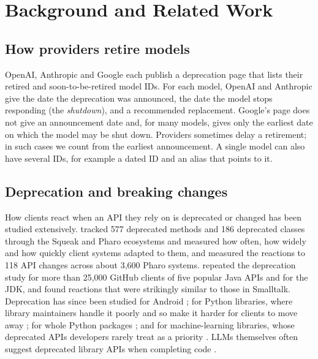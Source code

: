 \section{Background and Related Work}\label{sec:background}

\subsection{How providers retire models}

OpenAI, Anthropic and Google each publish a deprecation page that lists their retired and soon-to-be-retired model IDs. For each model, OpenAI and Anthropic give the date the deprecation was announced, the date the model stops responding (the \emph{shutdown}), and a recommended replacement. Google's page does not give an announcement date and, for many models, gives only the earliest date on which the model may be shut down. Providers sometimes delay a retirement; in such cases we count from the earliest announcement. A single model can also have several IDs, for example a dated ID and an alias that points to it.

\subsection{Deprecation and breaking changes}

How clients react when an API they rely on is deprecated or changed has been studied extensively. \citet{robbes2012deprecation} tracked 577 deprecated methods and 186 deprecated classes through the Squeak and Pharo ecosystems and measured how often, how widely and how quickly client systems adapted to them, and \citet{hora2018react} measured the reactions to 118 API changes across about 3,600 Pharo systems. \citet{sawant2018deprecation} repeated the deprecation study for more than 25,000 GitHub clients of five popular Java APIs and for the JDK, and found reactions that were strikingly similar to those in Smalltalk. Deprecation has since been studied for Android \citep{li2018deprecated}; for Python libraries, where library maintainers handle it poorly and so make it harder for clients to move away \citep{wang2020python}; for whole Python packages \citep{zhong2024package}; and for machine-learning libraries, whose deprecated APIs developers rarely treat as a priority \citep{haryono2021mlapi}. LLMs themselves often suggest deprecated library APIs when completing code \citep{wang2025llmdeprecated}.

